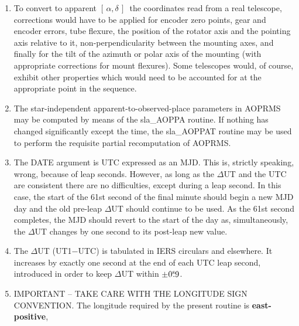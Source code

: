 \documentclass[11pt,twoside]{article}
\newcommand{\radec}     {$[\,\alpha,\delta\,]$}
\newcommand{\tseci}[1]   {$#1$\mbox{$^{\rm s}$}}
\newcommand{\tsec}[2]    {\tseci{#1}$\hspace{-0.3em}.#2$}
\renewcommand{\tsec}[2] {$#1^{\rm s}\hspace{-0.3em}.#2$}
\begin{document}
{\begin{enumerate}
        \radec\ will be required,
        in which case further transformations will be necessary.  The
        sla\_AMP {\it etc.}\ routines will convert
        the apparent \radec\ produced
        by the present routine into an FK5 J2000 mean place, by
        allowing for the Sun's gravitational lens effect, annual
        aberration, nutation and precession.  Should FK4 B1950
        coordinates be required, the routines sla\_FK524 {\it etc.}\ will also
        have to be applied.
  \item To convert to apparent \radec\ the coordinates read from a
        real telescope, corrections would have to be applied for
        encoder zero points, gear and encoder errors, tube flexure,
        the position of the rotator axis and the pointing axis
        relative to it, non-perpendicularity between the mounting
        axes, and finally for the tilt of the azimuth or polar axis
        of the mounting (with appropriate corrections for mount
        flexures).  Some telescopes would, of course, exhibit other
        properties which would need to be accounted for at the
        appropriate point in the sequence.
  \item The star-independent apparent-to-observed-place parameters
        in AOPRMS may be computed by means of the sla\_AOPPA routine.
        If nothing has changed significantly except the time, the
        sla\_AOPPAT routine may be used to perform the requisite
        partial recomputation of AOPRMS.
  \item The DATE argument is UTC expressed as an MJD.  This is,
        strictly speaking, wrong, because of leap seconds.  However,
        as long as the $\Delta$UT and the UTC are consistent there
        are no difficulties, except during a leap second.  In this
        case, the start of the 61st second of the final minute should
        begin a new MJD day and the old pre-leap $\Delta$UT should
        continue to be used.  As the 61st second completes, the MJD
        should revert to the start of the day as, simultaneously,
        the $\Delta$UT changes by one second to its post-leap new value.
  \item The $\Delta$UT (UT1$-$UTC) is tabulated in IERS circulars and
        elsewhere.  It increases by exactly one second at the end of
        each UTC leap second, introduced in order to keep $\Delta$UT
        within $\pm$\tsec{0}{9}.
  \item IMPORTANT -- TAKE CARE WITH THE LONGITUDE SIGN CONVENTION.  The
        longitude required by the present routine is {\bf east-positive},

\end{enumerate}}
\end{document}
